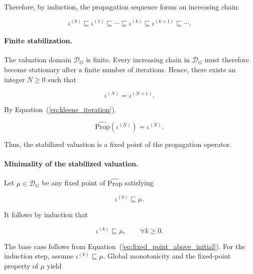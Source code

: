 \documentclass[10pt]{article}
\begin{document}
	Therefore, by induction, the propagation sequence forms an increasing chain:
	
	\begin{equation}
		\iota^{(0)}
		\sqsubseteq
		\iota^{(1)}
		\sqsubseteq
		\cdots
		\sqsubseteq
		\iota^{(k)}
		\sqsubseteq
		\iota^{(k+1)}
		\sqsubseteq
		\cdots.
		\label{eq:increasing_chain}
	\end{equation}
	
	\paragraph{Finite stabilization.}
	
	The valuation domain $\mathcal D_G$ is finite. Every increasing chain in
	$\mathcal D_G$ must therefore become stationary after a finite number of
	iterations. Hence, there exists an integer $N\geq 0$ such that
	
	\begin{equation}
		\iota^{(N)}
		=
		\iota^{(N+1)}.
		\label{eq:stabilization}
	\end{equation}
	
	By Equation~(\ref{eq:kleene_iteration}),
	
	\begin{equation}
		\widehat{\mathrm{Prop}}
		\!\left(
		\iota^{(N)}
		\right)
		=
		\iota^{(N)}.
		\label{eq:iteration_fixed_point}
	\end{equation}
	
	Thus, the stabilized valuation is a fixed point of the propagation operator.
	
	\paragraph{Minimality of the stabilized valuation.}
	
	Let $\mu\in\mathcal D_G$ be any fixed point of
	$\widehat{\mathrm{Prop}}$ satisfying
	
	\begin{equation}
		\iota^{(0)}
		\sqsubseteq
		\mu.
		\label{eq:fixed_point_above_initial}
	\end{equation}
	
	It follows by induction that
	
	\begin{equation}
		\iota^{(k)}
		\sqsubseteq
		\mu,
		\qquad
		\forall k\geq 0.
		\label{eq:iteration_below_fixed_point}
	\end{equation}
	
	The base case follows from
	Equation~(\ref{eq:fixed_point_above_initial}). For the induction step, assume
	$\iota^{(k)}\sqsubseteq\mu$. Global monotonicity and the fixed-point property of
	$\mu$ yield
	
\end{document}
